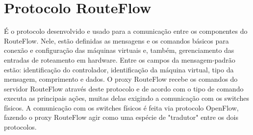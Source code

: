 \section{Protocolo RouteFlow}

É o protocolo desenvolvido e usado para a comunicação entre os componentes do RouteFlow. Nele, estão definidas as mensagens e os comandos básicos para conexão e
configuração das máquinas virtuais e, também, gerenciamento das entradas de roteamento em hardware. Entre os campos da mensagem-padrão estão: identificação do controlador,
identificação da máquina virtual, tipo da mensagem, comprimento e dados. O proxy RouteFlow recebe os  comandos do servidor RouteFlow através deste protocolo e de acordo com o tipo de comando executa as principais ações, muitas delas exigindo a comunicação com os switches físicos. A comunicação com os switches físicos é feita via protocolo OpenFlow, fazendo o proxy RouteFlow agir como uma espécie de "tradutor" entre os dois protocolos.